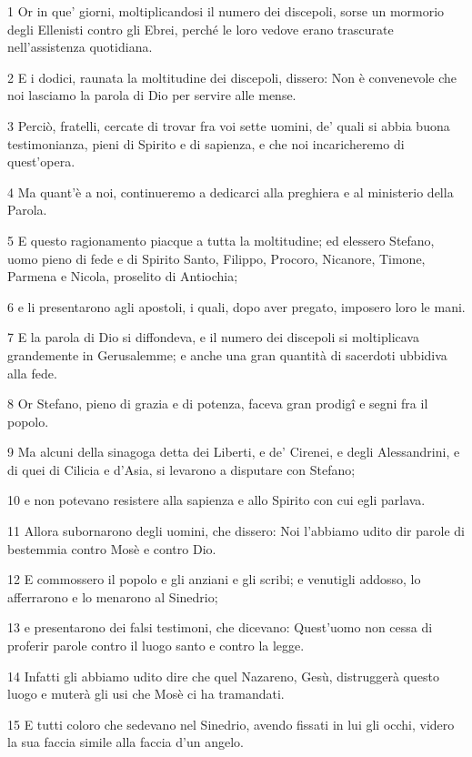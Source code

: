 \par 1 Or in que' giorni, moltiplicandosi il numero dei discepoli, sorse un mormorio degli Ellenisti contro gli Ebrei, perché le loro vedove erano trascurate nell'assistenza quotidiana.
\par 2 E i dodici, raunata la moltitudine dei discepoli, dissero: Non è convenevole che noi lasciamo la parola di Dio per servire alle mense.
\par 3 Perciò, fratelli, cercate di trovar fra voi sette uomini, de' quali si abbia buona testimonianza, pieni di Spirito e di sapienza, e che noi incaricheremo di quest'opera.
\par 4 Ma quant'è a noi, continueremo a dedicarci alla preghiera e al ministerio della Parola.
\par 5 E questo ragionamento piacque a tutta la moltitudine; ed elessero Stefano, uomo pieno di fede e di Spirito Santo, Filippo, Procoro, Nicanore, Timone, Parmena e Nicola, proselito di Antiochia;
\par 6 e li presentarono agli apostoli, i quali, dopo aver pregato, imposero loro le mani.
\par 7 E la parola di Dio si diffondeva, e il numero dei discepoli si moltiplicava grandemente in Gerusalemme; e anche una gran quantità di sacerdoti ubbidiva alla fede.
\par 8 Or Stefano, pieno di grazia e di potenza, faceva gran prodigî e segni fra il popolo.
\par 9 Ma alcuni della sinagoga detta dei Liberti, e de' Cirenei, e degli Alessandrini, e di quei di Cilicia e d'Asia, si levarono a disputare con Stefano;
\par 10 e non potevano resistere alla sapienza e allo Spirito con cui egli parlava.
\par 11 Allora subornarono degli uomini, che dissero: Noi l'abbiamo udito dir parole di bestemmia contro Mosè e contro Dio.
\par 12 E commossero il popolo e gli anziani e gli scribi; e venutigli addosso, lo afferrarono e lo menarono al Sinedrio;
\par 13 e presentarono dei falsi testimoni, che dicevano: Quest'uomo non cessa di proferir parole contro il luogo santo e contro la legge.
\par 14 Infatti gli abbiamo udito dire che quel Nazareno, Gesù, distruggerà questo luogo e muterà gli usi che Mosè ci ha tramandati.
\par 15 E tutti coloro che sedevano nel Sinedrio, avendo fissati in lui gli occhi, videro la sua faccia simile alla faccia d'un angelo.

